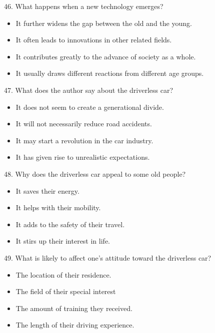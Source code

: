 \documentclass[UTF8,11pt]{ctexart}
\begin{document}
46. What happens when a new technology emerges?


\begin{itemize}[leftmargin=2em,itemsep=.2em,topsep=.4em]\item[A.] It further widens the gap between the old and the young.
\item[B.] It often leads to innovations in other related fields.
\item[C.] It contributes greatly to the advance of society as a whole.
\item[D.] It usually draws different reactions from different age groups.
\end{itemize}

47. What does the author say about the driverless car?


\begin{itemize}[leftmargin=2em,itemsep=.2em,topsep=.4em]\item[A.] It does not seem to create a generational divide.
\end{itemize}

\begin{itemize}[leftmargin=2em,itemsep=.2em,topsep=.4em]\item[B.] It will not necessarily reduce road accidents.
\item[C.] It may start a revolution in the car industry.
\item[D.] It has given rise to unrealistic expectations.
\end{itemize}

48. Why does the driverless car appeal to some old people?


\begin{itemize}[leftmargin=2em,itemsep=.2em,topsep=.4em]\item[A.] It saves their energy.
\item[B.] It helps with their mobility.
\item[C.] It adds to the safety of their travel.
\item[D.] It stirs up their interest in life.
\end{itemize}

49. What is likely to affect one’s attitude toward the driverless car?


\begin{itemize}[leftmargin=2em,itemsep=.2em,topsep=.4em]\item[A.] The location of their residence.
\item[B.] The field of their special interest
\item[C.] The amount of training they received.
\item[D.] The length of their driving experience.
\end{itemize}
\end{document}
